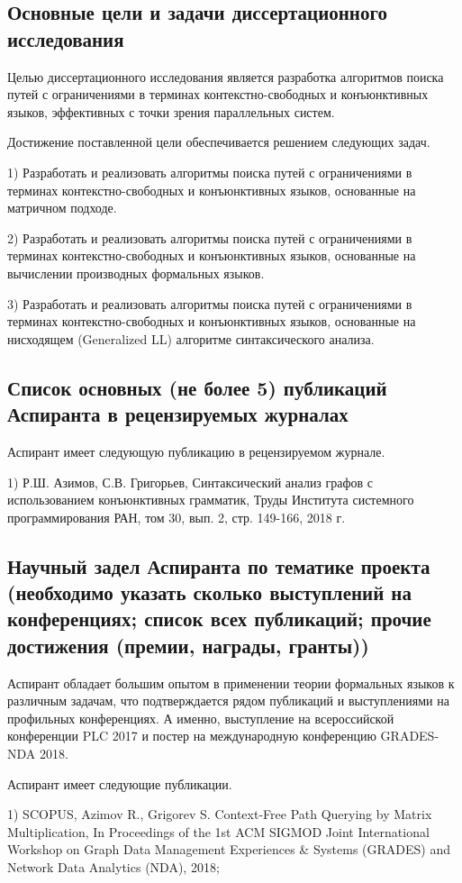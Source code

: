 \documentclass[12pt]{article}  %
\theoremstyle{remark}
\begin{document}
\subsection{Основные цели и задачи диссертационного исследования}
Целью диссертационного исследования является разработка алгоритмов поиска путей с ограничениями в терминах контекстно-свободных и конъюнктивных языков, эффективных с точки зрения параллельных систем.

Достижение поставленной цели обеспечивается решением следующих задач.

1) Разработать и реализовать алгоритмы поиска путей с ограничениями в терминах контекстно-свободных и конъюнктивных языков, основанные на матричном подходе.

2) Разработать и реализовать алгоритмы поиска путей с ограничениями в терминах контекстно-свободных и конъюнктивных языков, основанные на вычислении производных формальных языков.

3) Разработать и реализовать алгоритмы поиска путей с ограничениями в терминах контекстно-свободных и конъюнктивных языков, основанные на нисходящем (Generalized LL) алгоритме синтаксического анализа.

\subsection{Список основных (не более 5) публикаций Аспиранта в рецензируемых журналах}
Аспирант имеет следующую публикацию в рецензируемом журнале.

1) Р.Ш. Азимов, С.В. Григорьев, Синтаксический анализ графов с использованием конъюнктивных грамматик, Труды Института системного программирования РАН, том 30, вып. 2, стр. 149-166, 2018 г.
\subsection{Научный задел Аспиранта по тематике проекта (необходимо указать сколько выступлений на конференциях; список всех публикаций; прочие достижения (премии, награды, гранты))}
Аспирант обладает большим опытом в применении теории формальных языков к различным задачам, что подтверждается рядом публикаций и выступлениями на профильных конференциях. А именно, выступление на всероссийской конференции PLC 2017 и постер на международную конференцию GRADES-NDA 2018.

Аспирант имеет следующие публикации.

1) SCOPUS, Azimov R., Grigorev S. Context-Free Path Querying by Matrix Multiplication, In Proceedings of the 1st ACM SIGMOD Joint International Workshop on Graph Data Management Experiences \& Systems (GRADES) and Network Data Analytics (NDA), 2018;
\end{document}
